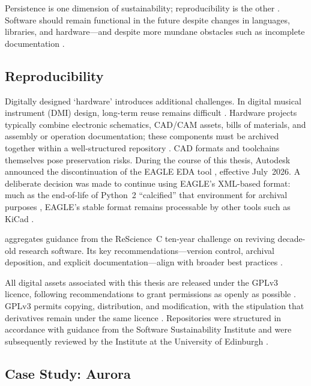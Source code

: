 Persistence is one dimension of sustainability; reproducibility is the other
\cite{perkel_challenge_2020}. Software should remain functional in the future
despite changes in languages, libraries, and hardware---and despite more mundane
obstacles such as incomplete documentation \cite{robert_reproducibility_2020}.

\subsection{Reproducibility}\label{hardware-reproducibility}

Digitally designed `hardware' introduces additional challenges. In digital
musical instrument (DMI) design, long-term reuse remains difficult
\cite{fiordelmondo_towards_2025}. Hardware projects typically combine electronic
schematics, CAD/CAM assets, bills of materials, and assembly or operation
documentation; these components must be archived together within a
well-structured repository \cite{calegario_documentation_2021}. CAD formats and
toolchains themselves pose preservation risks. During the course of this thesis,
Autodesk announced the discontinuation of the EAGLE EDA tool
\cite{autodesk_eagle_2024}, effective July~2026. A deliberate decision was made
to continue using EAGLE’s XML-based format: much as the end-of-life of Python~2
``calcified'' that environment for archival purposes \cite{rougier_loupe_2020},
EAGLE’s stable format remains processable by other tools such as KiCad
\cite{kicad_eagle_2024}.

\textcite{perkel_challenge_2020} aggregates guidance from the ReScience~C
ten-year challenge on reviving decade-old research software. Its key
recommendations---version control, archival deposition, and explicit
documentation---align with broader best practices \cite{smith_software_2016,
stall_journal_2023}.

All digital assets associated with this thesis are released under the GPLv3
licence, following recommendations to grant permissions as openly as possible
\cite{stall_journal_2023}. GPLv3 permits copying, distribution, and
modification, with the stipulation that derivatives remain under the same
licence \cite{gplv3}. Repositories were structured in accordance with guidance
from the Software Sustainability Institute and were subsequently reviewed by the
Institute at the University of Edinburgh \cite{ssi_online_2025}.


\subsection{Case Study: Aurora}\label{sec:aurora}

